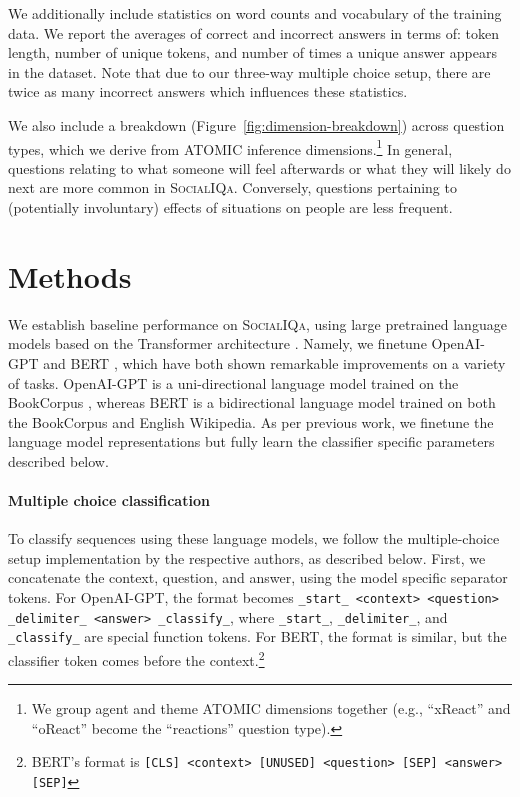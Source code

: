 We additionally include statistics on word counts and vocabulary of the training data. We report the averages of correct and incorrect answers in terms of: token length, number of unique tokens, and number of times a unique answer appears in the dataset. Note that due to our three-way multiple choice setup, there are twice as many incorrect answers which influences these statistics.

We also include a breakdown (Figure~\ref{fig:dimension-breakdown}) across question types, which we derive from ATOMIC inference dimensions.\footnote{We group agent and theme ATOMIC dimensions together (e.g., ``xReact'' and ``oReact'' become the ``reactions'' question type).} In general, questions relating to what someone will feel afterwards or what they will likely do next are more common in \textsc{SocialIQa}. 
Conversely, questions pertaining to (potentially involuntary) effects of situations on people are less frequent.

\section{Methods}
We establish baseline performance on \textsc{SocialIQa}, using large pretrained language models based on the Transformer architecture \cite{transformers}. Namely, we finetune OpenAI-GPT \cite{OpenAI-GPT} and BERT \cite{BERT}, which have both shown remarkable improvements on a variety of tasks. OpenAI-GPT is a uni-directional language model trained on the BookCorpus \cite{Zhu2015AligningBA}, whereas BERT is a bidirectional language model trained on both the BookCorpus and English Wikipedia. As per previous work, we finetune the language model representations but fully learn the classifier specific parameters described below.

\paragraph{Multiple choice classification} To classify sequences using these language models, we follow the multiple-choice setup implementation by the respective authors, as described below. First, we concatenate the context, question, and answer, using the model specific separator tokens. For OpenAI-GPT, the format becomes \texttt{\_start\_ <context>  <question> \_delimiter\_ <answer> \_classify\_}, where \texttt{\_start\_}, \texttt{\_delimiter\_}, and \texttt{\_classify\_} are special function tokens. For BERT, the format is similar, but the classifier token comes before the context.\footnote{BERT's format is \texttt{[CLS] <context> [UNUSED] <question> [SEP] <answer> [SEP]}} 


